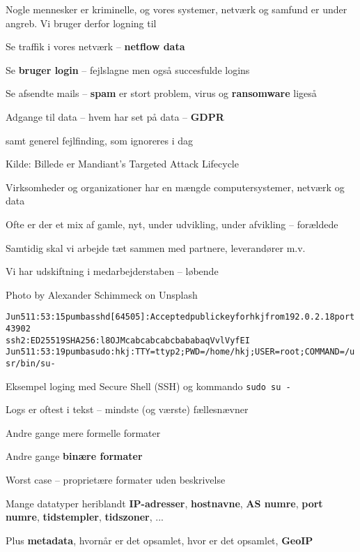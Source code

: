\documentclass[Screen16to9,17pt]{foils}
\begin{document}
Nogle mennesker er kriminelle, og vores systemer, netværk og samfund er under angreb. Vi bruger derfor logning til
\begin{list2}
\item Se traffik i vores netværk -- {\bf netflow data}
\item Se {\bf bruger login} -- fejlslagne men også succesfulde logins
\item Se afsendte mails -- {\bf spam} er stort problem, {virus og \bf ransomware} ligeså
\item Adgange til data -- hvem har set på data -- {\bf GDPR}
\item samt generel fejlfinding, som ignoreres i dag
\end{list2}

Kilde: Billede er Mandiant’s Targeted Attack Lifecycle





\begin{list2}
\item Virksomheder og organizationer har en mængde computersystemer, netværk og data
\item Ofte er der et mix af gamle, nyt, under udvikling, under afvikling -- forældede
\item Samtidig skal vi arbejde tæt sammen med partnere, leverandører m.v.
\item Vi har udskiftning i medarbejderstaben -- løbende
\end{list2}
\hfill {\small Photo by Alexander Schimmeck on Unsplash}






\begin{alltt}\small
Jun  5 11:53:15 pumba sshd[64505]: Accepted publickey for hkj from 192.0.2.18 port 43902
ssh2: ED25519 SHA256:l8OJMcabcabcabcbababaqVvlVyfEI
Jun  5 11:53:19 pumba sudo:      hkj : TTY=ttyp2 ; PWD=/home/hkj ; USER=root ; COMMAND=/usr/bin/su -
\end{alltt}
Eksempel loging med Secure Shell (SSH) og kommando \verb+sudo su -+

\begin{list2}
\item Logs er oftest i tekst -- mindste (og værste) fællesnævner
\item Andre gange mere formelle formater
\item Andre gange {\bf binære formater}
\item Worst case -- proprietære formater uden beskrivelse
\item Mange datatyper heriblandt {\bf IP-adresser}, {\bf hostnavne}, {\bf AS numre}, {\bf port numre}, {\bf tidstempler}, {\bf tidszoner}, ...
\item Plus {\bf metadata}, hvornår er det opsamlet, hvor er det opsamlet, {\bf GeoIP}
\end{list2}
\end{document}
